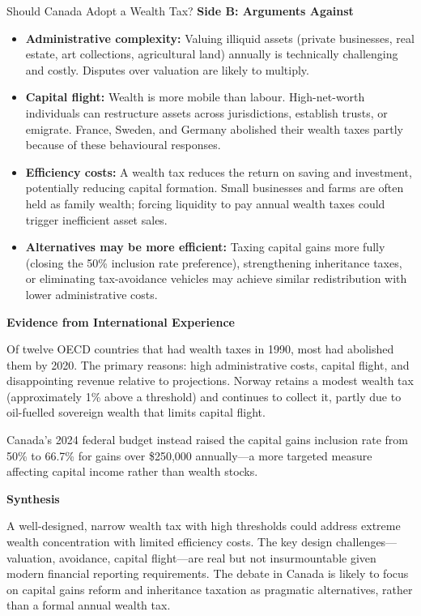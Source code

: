 \begin{policydebate}{Should Canada Adopt a Wealth Tax?}
\textbf{Side B: Arguments Against}

\begin{itemize}
  \item \textbf{Administrative complexity:} Valuing illiquid assets (private businesses, real estate, art collections, agricultural land) annually is technically challenging and costly. Disputes over valuation are likely to multiply.
  \item \textbf{Capital flight:} Wealth is more mobile than labour. High-net-worth individuals can restructure assets across jurisdictions, establish trusts, or emigrate. France, Sweden, and Germany abolished their wealth taxes partly because of these behavioural responses.
  \item \textbf{Efficiency costs:} A wealth tax reduces the return on saving and investment, potentially reducing capital formation. Small businesses and farms are often held as family wealth; forcing liquidity to pay annual wealth taxes could trigger inefficient asset sales.
  \item \textbf{Alternatives may be more efficient:} Taxing capital gains more fully (closing the 50\% inclusion rate preference), strengthening inheritance taxes, or eliminating tax-avoidance vehicles may achieve similar redistribution with lower administrative costs.
\end{itemize}

\textbf{Evidence from International Experience}

Of twelve OECD countries that had wealth taxes in 1990, most had abolished them by 2020. The primary reasons: high administrative costs, capital flight, and disappointing revenue relative to projections. Norway retains a modest wealth tax (approximately 1\% above a threshold) and continues to collect it, partly due to oil-fuelled sovereign wealth that limits capital flight.

Canada's 2024 federal budget instead raised the capital gains inclusion rate from 50\% to 66.7\% for gains over \$250,000 annually---a more targeted measure affecting capital income rather than wealth stocks.

\textbf{Synthesis}

A well-designed, narrow wealth tax with high thresholds could address extreme wealth concentration with limited efficiency costs. The key design challenges---valuation, avoidance, capital flight---are real but not insurmountable given modern financial reporting requirements. The debate in Canada is likely to focus on capital gains reform and inheritance taxation as pragmatic alternatives, rather than a formal annual wealth tax.
\end{policydebate}

